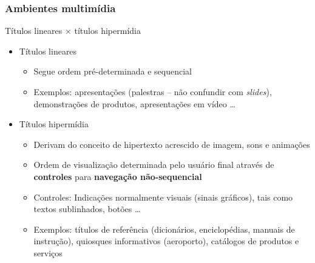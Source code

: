 \documentclass[xcolor]{beamer}
\begin{document}
\begin{frame}
    \frametitle{Ambientes multimídia}

    Títulos lineares $\times$ títulos hipermídia

    \begin{itemize}
        \item Títulos lineares

        \begin{itemize}
            \item Segue ordem pré-determinada e sequencial
            \item Exemplos: apresentações (palestras -- não confundir com {\it
slides}), demonstrações de produtos, apresentações em vídeo \ldots
        \end{itemize}

        \item Títulos hipermídia

        \begin{itemize}
            \item Derivam do conceito de hipertexto acrescido de imagem, sons e
animações
            \item Ordem de visualização determinada pelo usuário final através
de {\bf controles} para {\bf navegação não-sequencial}
            \item Controles: Indicações normalmente visuais (sinais gráficos),
tais como textos sublinhados, botões \ldots
            \item Exemplos: títulos de referência (dicionários, enciclopédias,
manuais de instrução), quiosques informativos (aeroporto), catálogos de produtos
e serviços
        \end{itemize}
    \end{itemize}

\end{frame}
\end{document}
